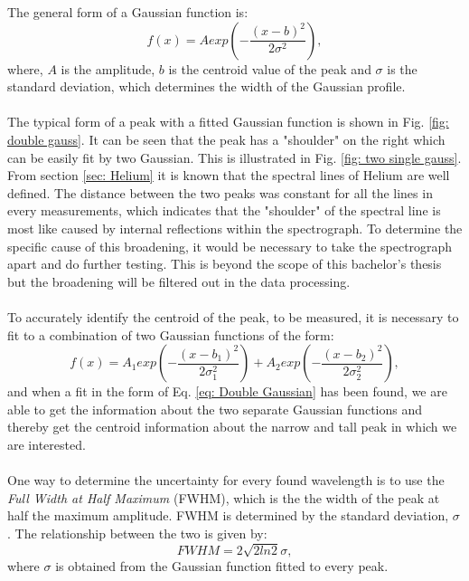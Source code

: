 The general form of a Gaussian function is:
\begin{equation}
f(x) = A exp\left(-\frac{(x-b)^2}{2  \sigma^2}\right),
\label{eq: Single Gaussian}
\end{equation}
where, $A$ is the amplitude, $b$ is the centroid value of the peak and $\sigma$ is the standard deviation, which determines the width of the Gaussian profile.
\\
\\
The typical form of a peak with a fitted Gaussian function is shown in Fig. \ref{fig: double gauss}. It can be seen that the peak has a "shoulder" on the right which can be easily fit by two Gaussian. This is illustrated in Fig. \ref{fig: two single gauss}. %
From section \ref{sec: Helium} it is known that the spectral lines of Helium are well defined. The distance between the two peaks was constant for all the lines in every measurements, which indicates that the "shoulder" of the spectral line is most like caused by internal reflections within the spectrograph. To determine the specific cause of this broadening, it would be necessary to take the spectrograph apart and do further testing. This is beyond the scope of this bachelor's thesis but the broadening will be filtered out in the data processing. 
\\
\\
To accurately identify the centroid of the peak, to be measured, it is necessary to fit to a combination of two Gaussian functions of the form:
\begin{equation}
f(x) = A_1 exp\left(-\frac{(x-b_1)^2}{2 \sigma_1^2}\right) + A_2 exp\left(-\frac{(x-b_2)^2}{2\sigma_2^2}\right),
\label{eq: Double Gaussian}
\end{equation}
and when a fit in the form of Eq. \ref{eq: Double Gaussian} has been found, we are able to get the information about the two separate Gaussian functions and thereby get the centroid information about the narrow and tall peak in which we are interested. 
\\
\\
One way to determine the uncertainty for every found wavelength is to use the \emph{Full Width at Half Maximum} (FWHM), which is the the width of the peak at half the maximum amplitude. FWHM is determined by the standard deviation, $\sigma$. The relationship between the two is given by:
\begin{equation}
FWHM = 2\sqrt{2ln2}\sigma,
\label{eq: FWHM}
\end{equation}
where $\sigma$ is obtained from the Gaussian function fitted to every peak.

